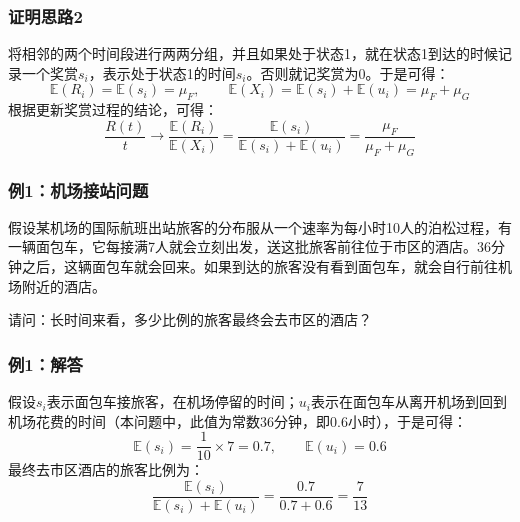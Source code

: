 \documentclass[t]{beamer}
\newcommand{\E}{\mathbb{E}}
\begin{document}
\begin{frame}
  \frametitle{证明思路2}
\begin{center}
\end{center}

  将相邻的两个时间段进行两两分组，并且如果处于状态1，就在状态1到达的时候记录一个奖赏$s_i$，表示处于状态1的时间$s_i$。否则就记奖赏为0。于是可得：
\[\E(R_i)=\E(s_i)=\mu_F,\qquad \E(X_i)=\E(s_i)+\E(u_i)=\mu_F+\mu_G\]
根据更新奖赏过程的结论，可得：
\[\frac{R(t)}{t}\to \frac{\E(R_i)}{\E(X_i)}=\frac{\E(s_i)}{\E(s_i)+\E(u_i)}=\frac{\mu_F}{\mu_F+\mu_G}\]

\end{frame}


\begin{frame}
  \frametitle{例1：机场接站问题}
  假设某机场的国际航班出站旅客的分布服从一个速率为每小时10人的泊松过程，有一辆面包车，它每接满7人就会立刻出发，送这批旅客前往位于市区的酒店。36分钟之后，这辆面包车就会回来。如果到达的旅客没有看到面包车，就会自行前往机场附近的酒店。

  请问：长时间来看，多少比例的旅客最终会去市区的酒店？
\end{frame}


\begin{frame}
  \frametitle{例1：解答}
  假设$s_i$表示面包车接旅客，在机场停留的时间；$u_i$表示在面包车从离开机场到回到机场花费的时间（本问题中，此值为常数36分钟，即$0.6$小时），于是可得：
  \[\E(s_i)=\frac{1}{10}\times 7=0.7,\qquad \E(u_i)=0.6\]
  最终去市区酒店的旅客比例为：
  \[\frac{\E(s_i)}{\E(s_i)+\E(u_i)}=\frac{0.7}{0.7+0.6}=\frac{7}{13}\]
  

\end{frame}
\end{document}
